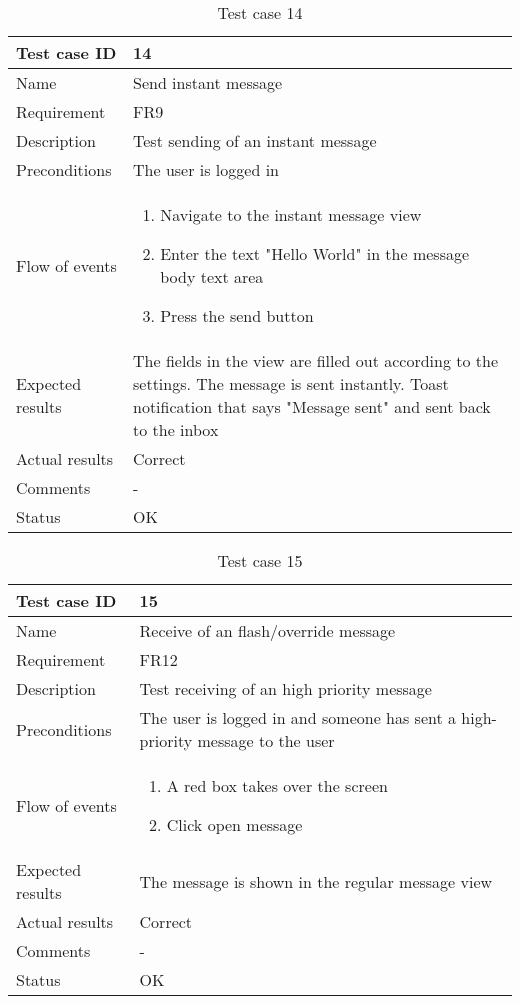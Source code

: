 		\begin{table}[htb]
			\begin{tabular}{l|p{10cm}}
				Test case ID & 14 \\ \hline
				Name & Send instant message\\ \hline
				Requirement & FR9\\ \hline
				Description & Test sending of an instant message\\ \hline
				Preconditions & The user is logged in\\ \hline
				Flow of events & 
					\begin{enumerate}
						\item{}Navigate to the instant message view
						\item{}Enter the text "Hello World" in the message body text area
						\item{}Press the send button
					\end{enumerate} \\ \hline
				Expected results & The fields in the view are filled out according to the settings. The message is sent instantly. Toast notification that says "Message sent" and sent back to the inbox \\ \hline
				Actual results & Correct\\ \hline
				Comments &-\\ \hline
				Status &OK \\ \hline
			\end{tabular}
			\caption{Test case 14} \label{tab:case14}
		\end{table}

		\begin{table}[htb]
			\begin{tabular}{l|p{10cm}}
				Test case ID & 15 \\ \hline
				Name & Receive of an flash/override message\\ \hline
				Requirement &FR12\\ \hline
				Description & Test receiving of an high priority message\\ \hline
				Preconditions & The user is logged in and someone has sent a high-priority message to the user\\ \hline
				Flow of events & 
					\begin{enumerate}
						\item{}A red box takes over the screen
						\item{}Click open message
					\end{enumerate} \\ \hline
				Expected results & The message is shown in the regular message view\\ \hline
				Actual results & Correct\\ \hline
				Comments & -\\ \hline
				Status & OK \\ \hline
			\end{tabular}
			\caption{Test case 15} \label{tab:case15}
		\end{table}

